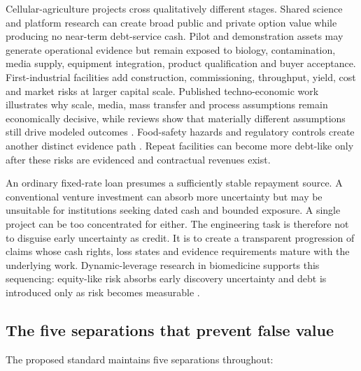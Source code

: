 \documentclass[11pt,a4paper]{article}
\begin{document}
Cellular-agriculture projects cross qualitatively different stages. Shared science and platform research can create broad public and private option value while producing no near-term debt-service cash. Pilot and demonstration assets may generate operational evidence but remain exposed to biology, contamination, media supply, equipment integration, product qualification and buyer acceptance. First-industrial facilities add construction, commissioning, throughput, yield, cost and market risks at larger capital scale. Published techno-economic work illustrates why scale, media, mass transfer and process assumptions remain economically decisive, while reviews show that materially different assumptions still drive modeled outcomes \citep{humbird2021scale,pasitka2024continuous,goodwin2024scoping}. Food-safety hazards and regulatory controls create another distinct evidence path \citep{fao2023safety}. Repeat facilities can become more debt-like only after these risks are evidenced and contractual revenues exist.

An ordinary fixed-rate loan presumes a sufficiently stable repayment source. A conventional venture investment can absorb more uncertainty but may be unsuitable for institutions seeking dated cash and bounded exposure. A single project can be too concentrated for either. The engineering task is therefore not to disguise early uncertainty as credit. It is to create a transparent progression of claims whose cash rights, loss states and evidence requirements mature with the underlying work. Dynamic-leverage research in biomedicine supports this sequencing: equity-like risk absorbs early discovery uncertainty and debt is introduced only as risk becomes measurable \citep{montazerhodjat2016dynamic}.

\subsection{The five separations that prevent false value}

The proposed standard maintains five separations throughout:
\end{document}
